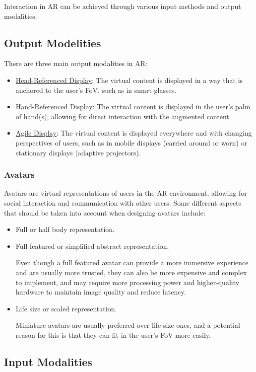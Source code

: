 Interaction in AR can be achieved through various input methods and output modalities.
\subsection{Output Modelities}

There are three main output modalities in AR:
\begin{itemize}
    \item \ul{Head-Referenced Display}: The virtual content is displayed in a way that is anchored to the user's FoV, such as in smart glasses.
    \item \ul{Hand-Referenced Display}: The virtual content is displayed in the user's palm of hand(s), allowing for direct interaction with the augmented content.
    \item \ul{Agile Display}: The virtual content is displayed everywhere and with changing perspectives of users, such as in mobile displays (carried around or worn) or stationary displays (adaptive projectors).
\end{itemize}

\subsubsection{Avatars}

Avatars are virtual representations of users in the AR environment, allowing for social interaction and communication with other users. Some different aspects that should be taken into account when designing avatars include:
\begin{itemize}
    \item Full or half body representation.
    \item Full featured or simplified abstract representation.
    
    Even though a full featured avatar can provide a more immersive experience and are usually more trusted, they can also be more expensive and complex to implement, and may require more processing power and higher-quality hardware to maintain image quality and reduce latency.
    \item Life size or scaled representation.
    
    Miniature avatars are usually preferred over life-size ones, and a potential reason for this is that they can fit in the user's FoV more easily.
\end{itemize}

\subsection{Input Modalities}

